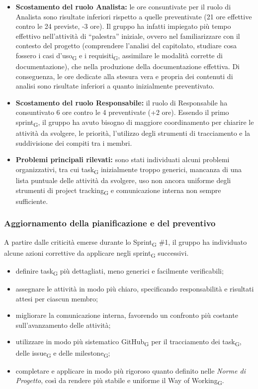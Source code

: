 \documentclass[a4paper, 10pt, colorlinks=true, linkcolor=black, urlcolor=blue, citecolor=blue, hidelinks]{article}
\begin{document}
\begin{itemize}
    \item \textbf{Scostamento del ruolo Analista:}
    le ore consuntivate per il ruolo di Analista sono risultate inferiori
    rispetto a quelle preventivate (21 ore effettive contro le 24 previste,
    -3 ore). Il gruppo ha infatti impiegato più tempo effettivo nell'attività
    di ``palestra'' iniziale, ovvero nel familiarizzare con il contesto del
    progetto (comprendere l'analisi del capitolato, studiare cosa fossero i
    casi d'uso\textsubscript{G} e i requisiti\textsubscript{G}, assimilare le
    modalità corrette di documentazione), che nella produzione della
    documentazione effettiva. Di conseguenza, le ore dedicate alla stesura
    vera e propria dei contenuti di analisi sono risultate inferiori a quanto
    inizialmente preventivato.

    \item \textbf{Scostamento del ruolo Responsabile:}
    il ruolo di Responsabile ha consuntivato 6 ore contro le 4 preventivate
    (+2 ore). Essendo il primo sprint\textsubscript{G}, il gruppo ha avuto
    bisogno di maggiore coordinamento per chiarire le attività da svolgere,
    le priorità, l'utilizzo degli strumenti di tracciamento e la suddivisione
    dei compiti tra i membri.

    \item \textbf{Problemi principali rilevati:}
    sono stati individuati alcuni problemi organizzativi, tra cui task\textsubscript{G} inizialmente troppo generici, mancanza di una lista puntuale delle attività da svolgere, uso non ancora uniforme degli strumenti di project tracking\textsubscript{G} e comunicazione interna non sempre sufficiente.
\end{itemize}

\subsubsection{Aggiornamento della pianificazione e del preventivo}
A partire dalle criticità emerse durante lo Sprint\textsubscript{G} \#1, il gruppo ha individuato alcune azioni correttive da applicare negli sprint\textsubscript{G} successivi.

\begin{itemize}
    \item definire task\textsubscript{G} più dettagliati, meno generici e facilmente verificabili;
    \item assegnare le attività in modo più chiaro, specificando responsabilità e risultati attesi per ciascun membro;
    \item migliorare la comunicazione interna, favorendo un confronto più costante sull'avanzamento delle attività;
    \item utilizzare in modo più sistematico GitHub\textsubscript{G} per il tracciamento dei task\textsubscript{G}, delle issue\textsubscript{G} e delle milestone\textsubscript{G};
    \item completare e applicare in modo più rigoroso quanto definito nelle \textit{Norme di Progetto}, così da rendere più stabile e uniforme il Way of Working\textsubscript{G}.
\end{itemize}
\end{document}
